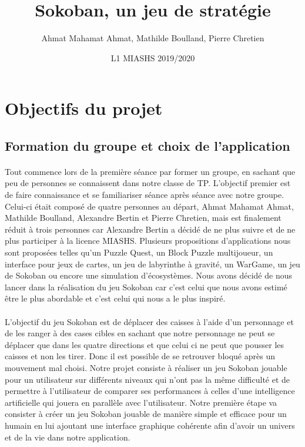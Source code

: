 \documentclass{article}
\title{Sokoban, un jeu de stratégie}
\author{Ahmat Mahamat Ahmat, Mathilde Boulland, Pierre Chretien}
\date{L1 MIASHS 2019/2020}
\begin{document}
 
\maketitle{}
\section{Objectifs du projet}
\subsection{Formation du groupe et choix de l'application}

\paragraph{} Tout commence lors de la première séance par former un groupe, en sachant que peu de personnes se connaissent dans notre classe de TP. L'objectif premier est de faire connaissance et se familiariser séance après séance avec notre groupe. Celui-ci était composé de quatre personnes au départ, Ahmat Mahamat Ahmat, Mathilde Boulland, Alexandre Bertin et Pierre Chretien, mais est finalement réduit à trois personnes car Alexandre Bertin a décidé de ne plus suivre et de ne plus participer à la licence MIASHS. Plusieurs propositions d'applications nous sont proposées telles qu'un Puzzle Quest, un Block Puzzle multijoueur, un interface pour jeux de cartes, un jeu de labyrinthe à gravité, un WarGame, un jeu de Sokoban ou encore une simulation d'écosystèmes. Nous avons décidé de nous lancer dans la réalisation du jeu Sokoban car c'est celui que nous avons estimé être le plus abordable et c'est celui qui nous a le plus inspiré. 
 \paragraph{} L'objectif du jeu Sokoban est de déplacer des caisses à l'aide d'un personnage et de les ranger à des cases cibles en sachant que notre personnage ne peut se déplacer que dans les quatre directions et que celui ci ne peut que pousser les caisses et non les tirer. Donc il est possible de se retrouver bloqué après un mouvement mal choisi. Notre projet consiste à réaliser un jeu Sokoban jouable pour un utilisateur sur différents niveaux qui n'ont pas la même difficulté et de permettre à l'utilisateur de comparer ses performances à celles d'une intelligence artificielle qui jouera en parallèle avec l'utilisateur. Notre première étape va consister à créer un jeu Sokoban jouable de manière simple et efficace pour un humain en lui ajoutant une interface graphique cohérente afin d'avoir un univers et de la vie dans notre application. 
\end{document}
